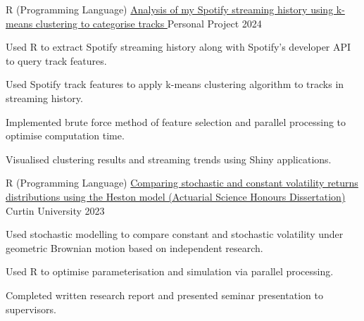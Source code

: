 

\begin{cventries}

  \cventry
    {R (Programming Language)} %
    {\href{https://harryz.netlify.app/projects/spotify-analysis/}{Analysis of my Spotify streaming history using k-means clustering to categorise tracks \ExternalLink}} %
    {Personal Project} %
    {2024} %
    {
      \begin{cvitems} %
        \item {Used R to extract Spotify streaming history along with Spotify's developer API to query track features.}
        \item {Used Spotify track features to apply k-means clustering algorithm to tracks in streaming history.}
        \item {Implemented brute force method of feature selection and parallel processing to optimise computation time.}
        \item {Visualised clustering results and streaming trends using Shiny applications.}
      \end{cvitems}
    }

  \cventry
    {R (Programming Language)} %
    {\href{https://www.researchgate.net/publication/372915363_Comparing_Stochastic_and_Constant_Volatility_Returns_Distributions_using_the_Heston_Model}{Comparing stochastic and constant volatility returns distributions using the Heston model (Actuarial Science Honours Dissertation) \ExternalLink}} %
    {Curtin University} %
    {2023} %
    {
      \begin{cvitems} %
        \item {Used stochastic modelling to compare constant and stochastic volatility under geometric Brownian motion based on independent research.}
        \item {Used R to optimise parameterisation and simulation via parallel processing.}
        \item {Completed written research report and presented seminar presentation to supervisors.}
      \end{cvitems}
    }


\end{cventries}
